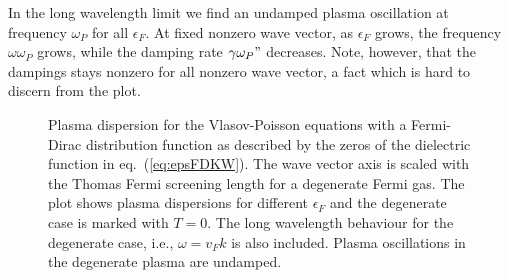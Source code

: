 \documentclass[physics,phd,nolot,nolof]{uccthesis}%
\begin{document}
In the long wavelength limit we find an undamped plasma oscillation at frequency $\omega_P$ for all $\epsilon_F$.
At fixed nonzero wave vector, as $\epsilon_F$ grows, the frequency $\omega\omega_P$ grows, while the damping rate $\gamma\omega_P"$ decreases. 
Note, however, that the dampings stays nonzero for all nonzero wave vector, a fact which is hard to discern from the plot.
\begin{figure}[h]
	\begin{center}
	\resizebox{\textwidth}{!}{}
	\end{center}
	\caption{Plasma dispersion for the Vlasov-Poisson equations with a Fermi-Dirac distribution function as described by the zeros of the dielectric function in eq.~(\ref{eq:epsFDKW}).
	The wave vector axis is scaled with the Thomas Fermi screening length for a degenerate Fermi gas. 
	The plot shows plasma dispersions for different $\epsilon_F$ and the degenerate case is marked with $T=0$. The long wavelength behaviour for the degenerate case, i.e., $\omega=v_Fk$ is also included. Plasma oscillations in the degenerate plasma are undamped.}
	\label{fig:plasmadispersionVPFDTF}
\end{figure}
\end{document}
